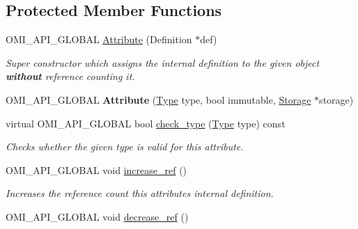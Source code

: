 \subsection*{Protected Member Functions}
\begin{DoxyCompactItemize}
\item 
O\+M\+I\+\_\+\+A\+P\+I\+\_\+\+G\+L\+O\+B\+AL \hyperlink{classomi_1_1_attribute_a15189f5bfe2cb81dbdafeb29f21ea8f0}{Attribute} (Definition $\ast$def)\hypertarget{classomi_1_1_attribute_a15189f5bfe2cb81dbdafeb29f21ea8f0}{}\label{classomi_1_1_attribute_a15189f5bfe2cb81dbdafeb29f21ea8f0}

\begin{DoxyCompactList}\small\item\em Super constructor which assigns the internal definition to the given object {\bfseries without} reference counting it. \end{DoxyCompactList}\item 
O\+M\+I\+\_\+\+A\+P\+I\+\_\+\+G\+L\+O\+B\+AL {\bfseries Attribute} (\hyperlink{classomi_1_1_attribute_aae4992bc8d2b12679548909bc813eecf}{Type} type, bool immutable, \hyperlink{classomi_1_1_attribute_1_1_storage}{Storage} $\ast$storage)\hypertarget{classomi_1_1_attribute_afd71075a24cf929b354cf9e8f89573d1}{}\label{classomi_1_1_attribute_afd71075a24cf929b354cf9e8f89573d1}

\item 
virtual O\+M\+I\+\_\+\+A\+P\+I\+\_\+\+G\+L\+O\+B\+AL bool \hyperlink{classomi_1_1_attribute_a351ac19ef02851d238f44bd2a101942c}{check\+\_\+type} (\hyperlink{classomi_1_1_attribute_aae4992bc8d2b12679548909bc813eecf}{Type} type) const \hypertarget{classomi_1_1_attribute_a351ac19ef02851d238f44bd2a101942c}{}\label{classomi_1_1_attribute_a351ac19ef02851d238f44bd2a101942c}

\begin{DoxyCompactList}\small\item\em Checks whether the given type is valid for this attribute. \end{DoxyCompactList}\item 
O\+M\+I\+\_\+\+A\+P\+I\+\_\+\+G\+L\+O\+B\+AL void \hyperlink{classomi_1_1_attribute_a91ec44ea94595d5bfef1b1300d1492bb}{increase\+\_\+ref} ()\hypertarget{classomi_1_1_attribute_a91ec44ea94595d5bfef1b1300d1492bb}{}\label{classomi_1_1_attribute_a91ec44ea94595d5bfef1b1300d1492bb}

\begin{DoxyCompactList}\small\item\em Increases the reference count this attribute\textquotesingle{}s internal definition. \end{DoxyCompactList}\item 
O\+M\+I\+\_\+\+A\+P\+I\+\_\+\+G\+L\+O\+B\+AL void \hyperlink{classomi_1_1_attribute_afe11b45c8cb9191181e48f273752243f}{decrease\+\_\+ref} ()\hypertarget{classomi_1_1_attribute_afe11b45c8cb9191181e48f273752243f}{}\label{classomi_1_1_attribute_afe11b45c8cb9191181e48f273752243f}


\end{DoxyCompactItemize}
